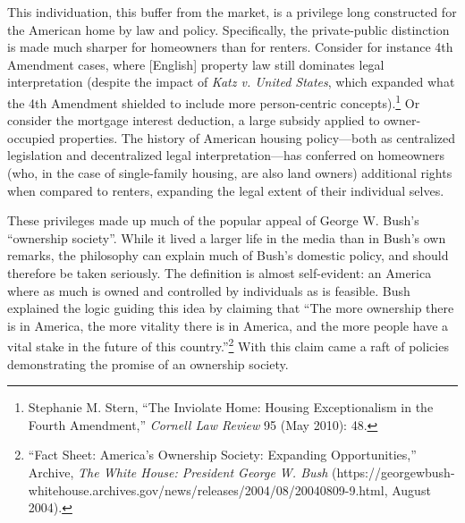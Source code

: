 \documentclass[12pt,oneside]{psthesis}
\begin{document}
This individuation, this buffer from the market, is a privilege long constructed for the American home by law and policy.
Specifically, the private-public distinction is made much sharper for homeowners than for renters.
Consider for instance 4th Amendment cases, where {[}English{]} property law still dominates legal interpretation (despite the impact of \emph{Katz v. United States}, which expanded what the 4th Amendment shielded to include more person-centric concepts).\footnote{Stephanie M. Stern, ``The Inviolate Home: Housing Exceptionalism in the Fourth Amendment,'' \emph{Cornell Law Review} 95 (May 2010): 48.}
Or consider the mortgage interest deduction, a large subsidy applied to owner-occupied properties.
The history of American housing policy---both as centralized legislation and decentralized legal interpretation---has conferred on homeowners (who, in the case of single-family housing, are also land owners) additional rights when compared to renters, expanding the legal extent of their individual selves.

These privileges made up much of the popular appeal of George W. Bush's ``ownership society''.
While it lived a larger life in the media than in Bush's own remarks, the philosophy can explain much of Bush's domestic policy, and should therefore be taken seriously.
The definition is almost self-evident: an America where as much is owned and controlled by individuals as is feasible.
Bush explained the logic guiding this idea by claiming that ``The more ownership there is in America, the more vitality there is in America, and the more people have a vital stake in the future of this country.''\footnote{``Fact Sheet: America's Ownership Society: Expanding Opportunities,'' Archive, \emph{The White House: President George W. Bush} (https://georgewbush-whitehouse.archives.gov/news/releases/2004/08/20040809-9.html, August 2004).}
With this claim came a raft of policies demonstrating the promise of an ownership society.
\end{document}
